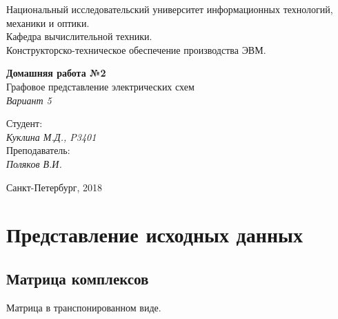 \documentclass[12pt, a4paper] {ncc}
\begin{document}
\setcounter{figure}{0}
\frenchspacing
\pagestyle{empty}
\begin{center}
     Национальный исследовательский университет информационных технологий,
                              механики и оптики.\\
                       Кафедра вычислительной техники.\\
            Конструкторско-техническое обеспечение производства ЭВМ.
\end{center}
\begin{center}
                         {\bf Домашняя работа №2}\\
                Графовое представление электрических схем\\
                              {\sl Вариант 5}
\end{center}
\begin{flushright}
                                    Студент:\\
                                    {\it Куклина М.Д., P3401}\\
                                    Преподаватель: \\
                                    {\it Поляков В.И.}
\end{flushright}
\begin{center}
                                      Санкт-Петербург, 2018
\end{center}
\newpage
\pagestyle{plain}
\section{Представление исходных данных}

\subsection{Матрица комплексов}

Матрица в транспонированном виде.
\end{document}
